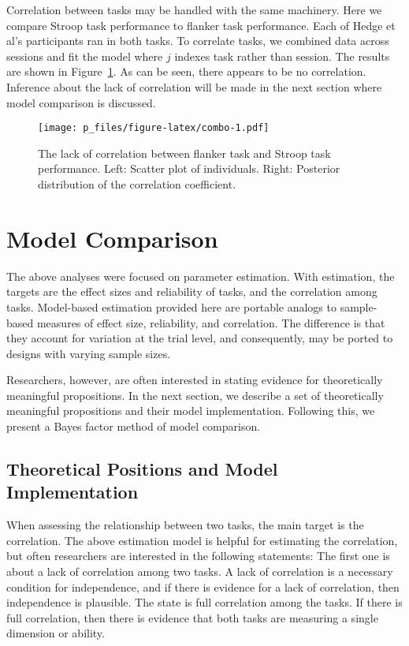 \documentclass[english,man]{apa6}
\theoremstyle{definition}
\theoremstyle{definition}
\theoremstyle{remark}
\begin{document}
Correlation between tasks may be handled with the same machinery. Here
we compare Stroop task performance to flanker task performance. Each of
Hedge et al's participants ran in both tasks. To correlate tasks, we
combined data across sessions and fit the model where \(j\) indexes task
rather than session. The results are shown in Figure~\ref{fig:combo}. As
can be seen, there appears to be no correlation. Inference about the
lack of correlation will be made in the next section where model
comparison is discussed.

\begin{figure}[htbp]
\centering
\texttt{[image: p\_files/figure-latex/combo-1.pdf]}
\caption{\label{fig:combo}The lack of correlation between flanker task and
Stroop task performance. Left: Scatter plot of individuals. Right:
Posterior distribution of the correlation coefficient.}
\end{figure}

\section{Model Comparison}\label{model-comparison}

The above analyses were focused on parameter estimation. With
estimation, the targets are the effect sizes and reliability of tasks,
and the correlation among tasks. Model-based estimation provided here
are portable analogs to sample-based measures of effect size,
reliability, and correlation. The difference is that they account for
variation at the trial level, and consequently, may be ported to designs
with varying sample sizes.

Researchers, however, are often interested in stating evidence for
theoretically meaningful propositions. In the next section, we describe
a set of theoretically meaningful propositions and their model
implementation. Following this, we present a Bayes factor method of
model comparison.

\subsection{Theoretical Positions and Model
Implementation}\label{theoretical-positions-and-model-implementation}

When assessing the relationship between two tasks, the main target is
the correlation. The above estimation model is helpful for estimating
the correlation, but often researchers are interested in the following
statements: The first one is about a lack of correlation among two
tasks. A lack of correlation is a necessary condition for independence,
and if there is evidence for a lack of correlation, then independence is
plausible. The state is full correlation among the tasks. If there is
full correlation, then there is evidence that both tasks are measuring a
single dimension or ability.
\end{document}

